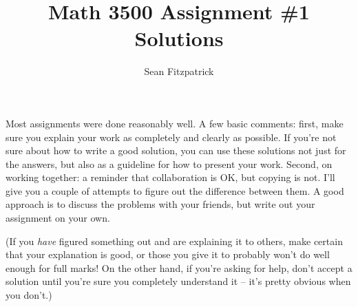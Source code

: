 \documentclass[12pt,letterpaper]{article}
\author{Sean Fitzpatrick}
\title{Math 3500 Assignment \#1 Solutions}
\begin{document}
\maketitle

Most assignments were done reasonably well. A few basic comments: first, make sure you explain your work as completely and clearly as possible. If you're not sure about how to write a good solution, you can use these solutions not just for the answers, but also as a guideline for how to present your work. Second, on working together: a reminder that collaboration is OK, but copying is not. I'll give you a couple of attempts to figure out the difference between them. A good approach is to discuss the problems with your friends, but write out your assignment on your own. 

(If you {\em have} figured something out and are explaining it to others, make certain that your explanation is good, or those you give it to probably won't do well enough for full marks! On the other hand, if you're asking for help, don't accept a solution until you're sure you completely understand it -- it's pretty obvious when you don't.)
\end{document}
